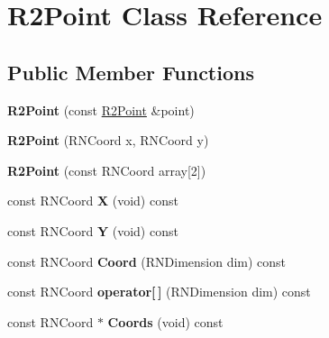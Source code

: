\hypertarget{class_r2_point}{}\section{R2\+Point Class Reference}
\label{class_r2_point}
\subsection*{Public Member Functions}
\begin{DoxyCompactItemize}
\item 
{\bfseries R2\+Point} (const \hyperlink{class_r2_point}{R2\+Point} \&point)\hypertarget{class_r2_point_a074b9a73407c6a4172bb2677579bf377}{}\label{class_r2_point_a074b9a73407c6a4172bb2677579bf377}

\item 
{\bfseries R2\+Point} (R\+N\+Coord x, R\+N\+Coord y)\hypertarget{class_r2_point_aa91535a2f5c6652929f815d5b243e2be}{}\label{class_r2_point_aa91535a2f5c6652929f815d5b243e2be}

\item 
{\bfseries R2\+Point} (const R\+N\+Coord array\mbox{[}2\mbox{]})\hypertarget{class_r2_point_a7c8fca397da9a11a40d214b505d2ed84}{}\label{class_r2_point_a7c8fca397da9a11a40d214b505d2ed84}

\item 
const R\+N\+Coord {\bfseries X} (void) const \hypertarget{class_r2_point_a2077e2701cebb613b9a50e7eb2ed8084}{}\label{class_r2_point_a2077e2701cebb613b9a50e7eb2ed8084}

\item 
const R\+N\+Coord {\bfseries Y} (void) const \hypertarget{class_r2_point_a632c1b0ddbb42882f2bcec7ef1b59a64}{}\label{class_r2_point_a632c1b0ddbb42882f2bcec7ef1b59a64}

\item 
const R\+N\+Coord {\bfseries Coord} (R\+N\+Dimension dim) const \hypertarget{class_r2_point_a1fb88d7e5a0c0a5d9bea7ed52c850dbf}{}\label{class_r2_point_a1fb88d7e5a0c0a5d9bea7ed52c850dbf}

\item 
const R\+N\+Coord {\bfseries operator\mbox{[}$\,$\mbox{]}} (R\+N\+Dimension dim) const \hypertarget{class_r2_point_a53dd93592028027d4a8876a9a8a4d7c4}{}\label{class_r2_point_a53dd93592028027d4a8876a9a8a4d7c4}

\item 
const R\+N\+Coord $\ast$ {\bfseries Coords} (void) const \hypertarget{class_r2_point_a168e6faec6fbd70b43fd78d22ecf058e}{}\label{class_r2_point_a168e6faec6fbd70b43fd78d22ecf058e}


\end{DoxyCompactItemize}
